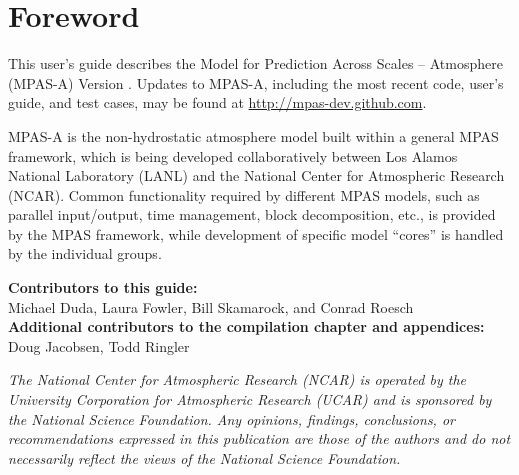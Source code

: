 \chapter*{Foreword}
\label{chap:foreword}

This user's guide describes the Model for Prediction Across Scales -- Atmosphere
(MPAS-A) Version \version. Updates to MPAS-A, including the most recent code,
user's guide, and test cases, may be found at \url{http://mpas-dev.github.com}.

MPAS-A is the non-hydrostatic atmosphere model built within a general MPAS
framework, which is being developed collaboratively between Los Alamos National
Laboratory (LANL) and the National Center for Atmospheric Research (NCAR).
Common functionality required by different MPAS models, such as parallel
input/output, time management, block decomposition, etc., is provided by the
MPAS framework, while development of specific model ``cores'' is handled by the
individual groups.

\vspace{8pt}
\noindent
{\bf Contributors to this guide:}\\
Michael Duda, Laura Fowler, Bill Skamarock, and Conrad Roesch\\
{\bf Additional contributors to the compilation chapter and appendices:}\\
Doug Jacobsen, Todd Ringler

\vspace{8pt}
\noindent
{\it The National Center for Atmospheric Research (NCAR) is operated by the
University Corporation for Atmospheric Research (UCAR) and is sponsored by the
National Science Foundation.  Any opinions, ﬁndings, conclusions, or
recommendations expressed in this publication are those of the authors and do
not necessarily reﬂect the views of the National Science Foundation.}
